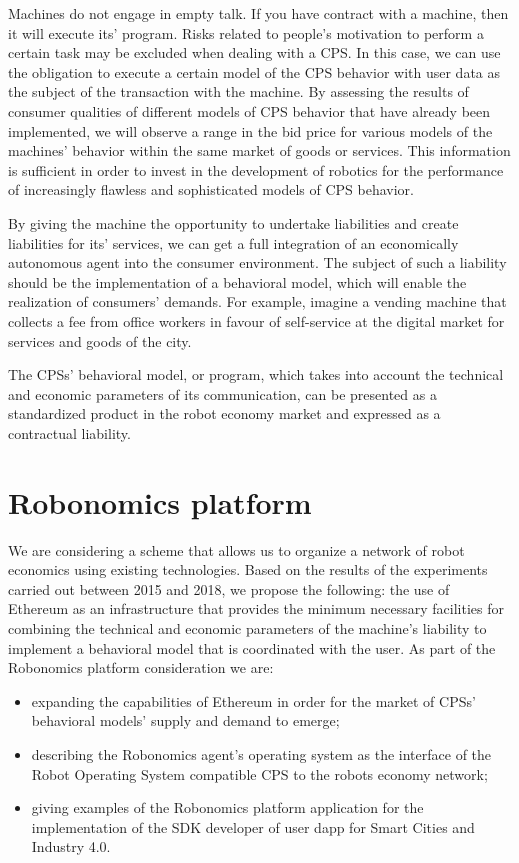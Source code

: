 \documentclass{article}
\begin{document}
Machines do not engage in empty talk. If you have contract with a machine, then it will execute its' program. Risks related to people's motivation to perform a certain task may be excluded when dealing with a CPS. In this case, we can use the obligation to execute a certain model of the CPS behavior with user data as the subject of the transaction with the machine. By assessing the results of consumer qualities of different models of CPS behavior that have already been implemented, we will observe a range in the bid price for various models of the machines' behavior within the same market of goods or services. This information is sufficient in order to invest in the development of robotics for the performance of increasingly flawless and sophisticated models of CPS behavior.

By giving the machine the opportunity to undertake liabilities and create liabilities for its' services, we can get a full integration of an economically autonomous agent into the consumer environment. The subject of such a liability should be the implementation of a behavioral model, which will enable the realization of consumers' demands. For example, imagine a vending machine that collects a fee from office workers in favour of self-service at the digital market for services and goods of the city.

The CPSs' behavioral model, or program, which takes into account the technical and economic parameters of its communication, can be presented as a standardized product in the robot economy market and expressed as a contractual liability.

\section{Robonomics platform}

We are considering a scheme that allows us to organize a network of robot economics using existing technologies. Based on the results of the experiments carried out between 2015 and 2018, we propose the following: the use of Ethereum as an infrastructure that provides the minimum necessary facilities for combining the technical and economic parameters of the machine's liability to implement a behavioral model that is coordinated with the user. As part of the Robonomics platform consideration we are:

\begin{itemize}[noitemsep]
	\item expanding the capabilities of Ethereum in order for the market of CPSs' behavioral models' supply and demand to emerge; 
	\item describing the Robonomics agent's operating system as the interface of the Robot Operating System \cite{Quigley2009ROS:System} compatible CPS to the robots economy network;
	\item giving examples of the Robonomics platform application for the implementation of the SDK developer of user dapp for Smart Cities and Industry 4.0.
\end{itemize}
\end{document}
